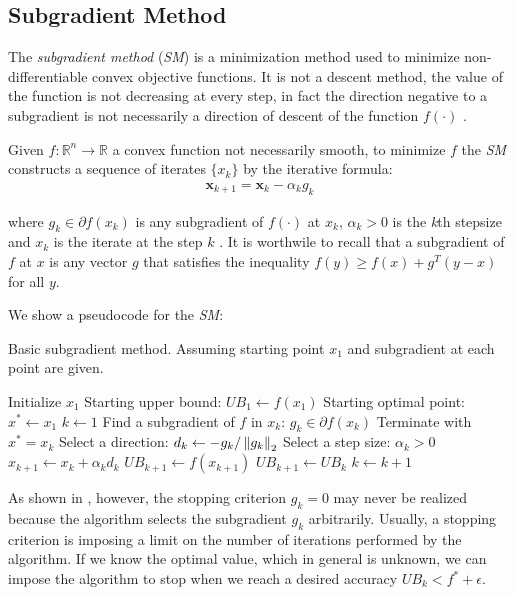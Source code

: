 \subsection{Subgradient Method}
The \textit{subgradient method} (\textit{SM}) is a minimization method used to minimize non-differentiable convex objective functions. It is not a descent method, the value of the function is not decreasing at every step, in fact the direction negative to a subgradient is not necessarily a direction of descent of the function $f(\cdot)$ \cite{nonlinearrus}.

Given $f: \mathbb{R}^n\to\mathbb{R}$ a convex function not necessarily smooth, to minimize $f$ the \textit{SM} constructs a sequence of iterates $\{x_k\}$ by the iterative formula:
\begin{align*}
    \mathbf{x}_{k+1} = \mathbf{x}_k - \alpha_k {g}_k
\end{align*}

where $g_k \in \partial f(x_k)$ is any subgradient of $f(\cdot)$ at $x_k$, $\alpha_k > 0$ is the \textit{k}th stepsize and $x_k$ is the iterate at the step $k$%
. It is worthwile to recall that a subgradient of $f$ at $x$ is any vector $g$ that satisfies the inequality ${f(y)\geq f(x) + g^T (y-x)}$ for all $y$.

We show a pseudocode for the \textit{SM}:
\begin{algorithm}[H]
    \caption{Basic subgradient method. Assuming starting point $x_1$ and subgradient at each point are given.}
	\label{alg:subalg}
	\begin{algorithmic}[1]
	    \State Initialize $\mathit{x_1}$
	    \State Starting upper bound: $\mathit{UB}_1 \leftarrow f(x_1)$
	    \State Starting optimal point: $x^* \leftarrow x_1$
	    \State $k \leftarrow 1$
		\State Find a subgradient of $f$ in $x_k$: $g_k \in \partial f(x_k)$
		\State Terminate with $x^* = x_k$
		\EndIf
		\State Select a direction: $d_k \leftarrow -g_k/\left\lVert g_k \right\rVert_2$
		\State Select a step size: $\alpha_k > 0$
		\State $x_{k+1} \leftarrow x_k + \alpha_k d_k$
            \State $\mathit{UB}_{k+1} \leftarrow f(x_{k+1})$
        \Else
            \State $\mathit{UB}_{k+1} \leftarrow \mathit{UB}_k$
		\EndIf
		\State $k \leftarrow k+1$
		\EndWhile
	\end{algorithmic}
\end{algorithm}
As shown in \parencite[Chap. 8.9]{shetty}, however, the stopping criterion $g_k = 0$ may never be realized because the algorithm selects the subgradient $g_k$ arbitrarily. Usually, a stopping criterion is imposing a limit on the number of iterations performed by the algorithm. If we know the optimal value, which in general is unknown, we can impose the algorithm to stop when we reach a desired accuracy $\mathit{UB}_k < f^* + \epsilon$.

